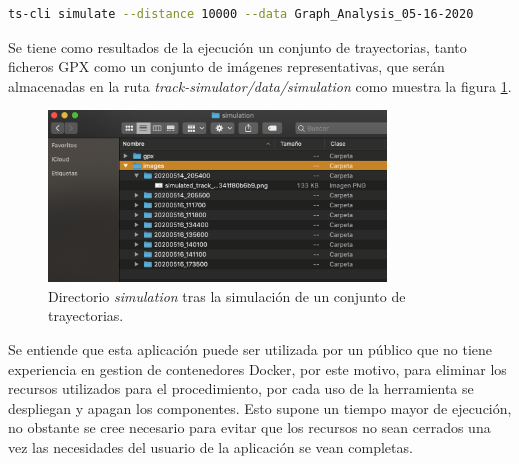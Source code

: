 \begin{lstlisting}[caption={Ejecución simulación}, language=bash, 
label={comand:Simulate}]  
	ts-cli simulate --distance 10000 --data Graph_Analysis_05-16-2020
\end{lstlisting}

Se tiene como resultados de la ejecución un conjunto de trayectorias, tanto ficheros 
\ac{GPX} como un conjunto de imágenes representativas, que serán almacenadas en la 
ruta \textit{track-simulator/data/simulation} como muestra la figura \ref{figure:SimulationFolder}.
\begin{figure}[!htb]
\begin{center}
\includegraphics[width=0.8\textwidth]{./Imagenes/SimulationFolderResults.png}
\caption{Directorio \textit{simulation} tras la simulación de un conjunto de trayectorias.}
\label{figure:SimulationFolder}
\end{center}
\end{figure}
\newpage

Se entiende que esta aplicación puede ser utilizada por un público que no tiene 
experiencia en gestion de contenedores Docker, por este motivo, para eliminar los 
recursos utilizados para el procedimiento, por cada uso de la herramienta se 
despliegan y apagan los componentes. Esto supone un tiempo mayor de ejecución, no 
obstante se cree necesario para evitar que los recursos no sean cerrados una vez las 
necesidades del usuario de la aplicación se vean completas.
